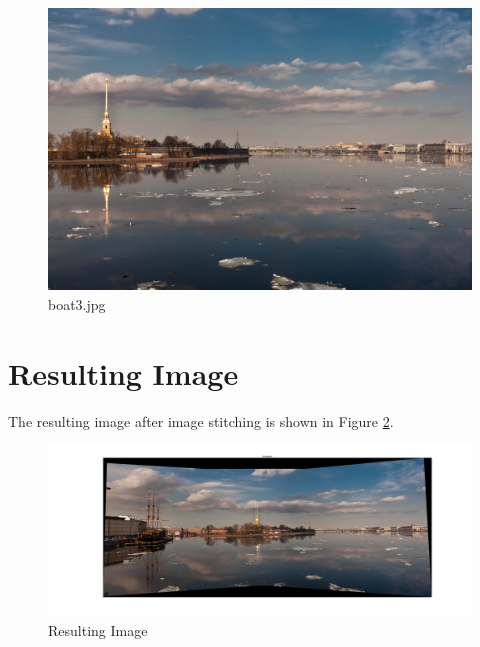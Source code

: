 \documentclass[english]{article}
\begin{document}
          \begin{figure}[H]
          \centering
          \includegraphics[width=1\textwidth]{boat3.jpg}
          \caption{boat3.jpg}
          \label{fig:boat3}
          \end{figure}
\section{Resulting Image}
The resulting image after image stitching is shown in Figure \ref{fig:resultimg}.
\begin{figure}[H]
          \centering
          \includegraphics[width=1\textwidth]{resultimg.jpg}
          \caption{Resulting Image}
          \label{fig:resultimg}
          \end{figure}
\end{document}
